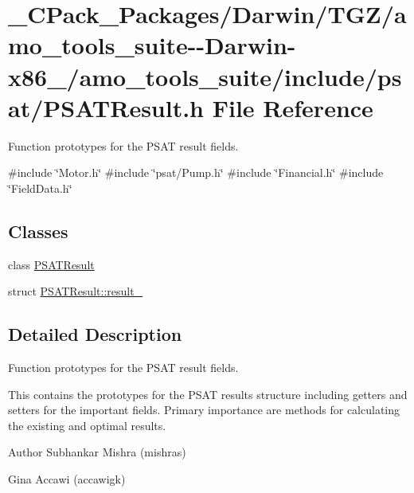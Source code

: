 \hypertarget{___c_pack___packages_2_darwin_2_t_g_z_2amo__tools__suite--_darwin-x86__64_2amo__tools__suite_2include_2psat_2_p_s_a_t_result_8h}{}\section{\+\_\+\+C\+Pack\+\_\+\+Packages/\+Darwin/\+T\+G\+Z/amo\+\_\+tools\+\_\+suite-\/-\/\+Darwin-\/x86\+\_/amo\+\_\+tools\+\_\+suite/include/psat/\+P\+S\+A\+T\+Result.h File Reference}
\label{___c_pack___packages_2_darwin_2_t_g_z_2amo__tools__suite--_darwin-x86__64_2amo__tools__suite_2include_2psat_2_p_s_a_t_result_8h}


Function prototypes for the P\+S\+AT result fields.  


{\ttfamily \#include \char`\"{}Motor.\+h\char`\"{}}\newline
{\ttfamily \#include \char`\"{}psat/\+Pump.\+h\char`\"{}}\newline
{\ttfamily \#include \char`\"{}Financial.\+h\char`\"{}}\newline
{\ttfamily \#include \char`\"{}Field\+Data.\+h\char`\"{}}\newline
\subsection*{Classes}
\begin{DoxyCompactItemize}
\item 
class \hyperlink{class_p_s_a_t_result}{P\+S\+A\+T\+Result}
\item 
struct \hyperlink{struct_p_s_a_t_result_1_1result__}{P\+S\+A\+T\+Result\+::result\+\_\+}
\end{DoxyCompactItemize}


\subsection{Detailed Description}
Function prototypes for the P\+S\+AT result fields. 

This contains the prototypes for the P\+S\+AT results structure including getters and setters for the important fields. Primary importance are methods for calculating the existing and optimal results.

\begin{DoxyAuthor}{Author}
Subhankar Mishra (mishras) 

Gina Accawi (accawigk) 
\end{DoxyAuthor}
